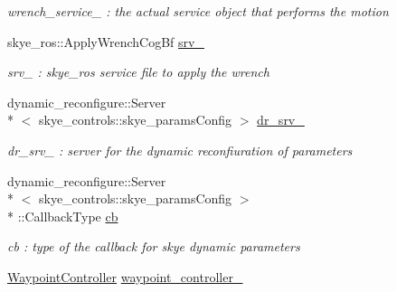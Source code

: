 \begin{DoxyCompactItemize}
\begin{DoxyCompactList}\small\item\em wrench\-\_\-service\-\_\- \-: the actual service object that performs the motion \end{DoxyCompactList}\item 
\hypertarget{class_pose_controller_node_aa08c4e05bd18d973ac01e99bd415fbe3}{skye\-\_\-ros\-::\-Apply\-Wrench\-Cog\-Bf \hyperlink{class_pose_controller_node_aa08c4e05bd18d973ac01e99bd415fbe3}{srv\-\_\-}}\label{class_pose_controller_node_aa08c4e05bd18d973ac01e99bd415fbe3}

\begin{DoxyCompactList}\small\item\em srv\-\_\- \-: skye\-\_\-ros service file to apply the wrench \end{DoxyCompactList}\item 
\hypertarget{class_pose_controller_node_a08db6de4600ef3631b3ac85f2fe777e5}{dynamic\-\_\-reconfigure\-::\-Server\\*
$<$ skye\-\_\-controls\-::skye\-\_\-params\-Config $>$ \hyperlink{class_pose_controller_node_a08db6de4600ef3631b3ac85f2fe777e5}{dr\-\_\-srv\-\_\-}}\label{class_pose_controller_node_a08db6de4600ef3631b3ac85f2fe777e5}

\begin{DoxyCompactList}\small\item\em dr\-\_\-srv\-\_\- \-: server for the dynamic reconfiuration of parameters \end{DoxyCompactList}\item 
\hypertarget{class_pose_controller_node_a433ac966d6557d11e79f72d19727fb9f}{dynamic\-\_\-reconfigure\-::\-Server\\*
$<$ skye\-\_\-controls\-::skye\-\_\-params\-Config $>$\\*
\-::Callback\-Type \hyperlink{class_pose_controller_node_a433ac966d6557d11e79f72d19727fb9f}{cb}}\label{class_pose_controller_node_a433ac966d6557d11e79f72d19727fb9f}

\begin{DoxyCompactList}\small\item\em cb \-: type of the callback for skye dynamic parameters \end{DoxyCompactList}\item 
\hypertarget{class_pose_controller_node_ac4e7d1c5b466b87fc0d30e98a561073d}{\hyperlink{class_waypoint_controller}{Waypoint\-Controller} \hyperlink{class_pose_controller_node_ac4e7d1c5b466b87fc0d30e98a561073d}{waypoint\-\_\-controller\-\_\-}}\label{class_pose_controller_node_ac4e7d1c5b466b87fc0d30e98a561073d}


\end{DoxyCompactItemize}
